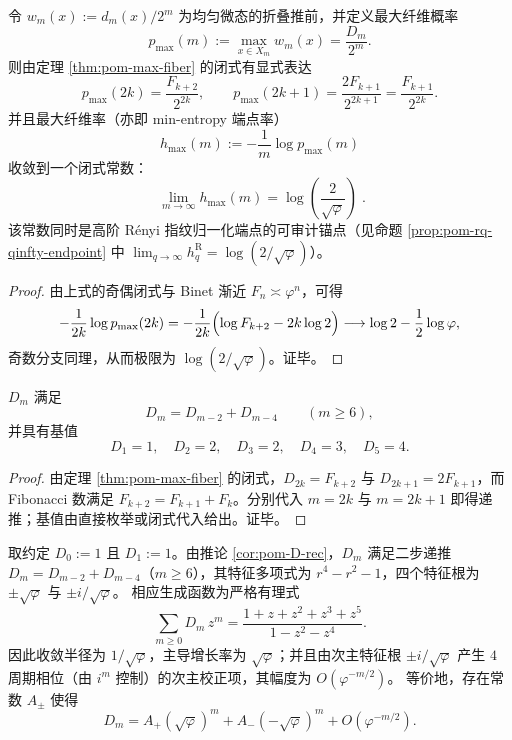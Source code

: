 \begin{corollary}[最大纤维概率端点与可审计极限常数]\label{cor:pom-max-fiber-rate-endpoint}
令 \(w_m(x):=d_m(x)/2^m\) 为均匀微态的折叠推前，并定义最大纤维概率
\[
p_{\max}(m):=\max_{x\in X_m}w_m(x)=\frac{D_m}{2^m}.
\]
则由定理 \ref{thm:pom-max-fiber} 的闭式有显式表达
\[
p_{\max}(2k)=\frac{F_{k+2}}{2^{2k}},
\qquad
p_{\max}(2k+1)=\frac{2F_{k+1}}{2^{2k+1}}=\frac{F_{k+1}}{2^{2k}}.
\]
并且最大纤维率（亦即 min-entropy 端点率）
\[
h_{\max}(m):=-\frac{1}{m}\log p_{\max}(m)
\]
收敛到一个闭式常数：
\[
\boxed{\;
\lim_{m\to\infty}h_{\max}(m)=\log\!\left(\frac{2}{\sqrt{\varphi}}\right)\; }.
\]
该常数同时是高阶 Rényi 指纹归一化端点的可审计锚点（见命题 \ref{prop:pom-rq-qinfty-endpoint} 中 \(\lim_{q\to\infty}h_q^{\mathrm R}=\log(2/\sqrt{\varphi})\)）。
\end{corollary}
\begin{proof}
由上式的奇偶闭式与 Binet 渐近 \(F_n\asymp \varphi^n\)，可得
\[
-\frac{1}{2k}\log p_{\max}(2k)
=-\frac{1}{2k}\Bigl(\log F_{k+2}-2k\log 2\Bigr)
\longrightarrow \log 2-\frac12\log\varphi,
\]
奇数分支同理，从而极限为 \(\log(2/\sqrt{\varphi})\)。证毕。
\end{proof}



\begin{corollary}[二步递推与基值]\label{cor:pom-D-rec}
$D_m$ 满足
\[
D_m=D_{m-2}+D_{m-4}\qquad(m\ge 6),
\]
并具有基值
\[
D_1=1,\quad D_2=2,\quad D_3=2,\quad D_4=3,\quad D_5=4.
\]
\end{corollary}
\begin{proof}
由定理 \ref{thm:pom-max-fiber} 的闭式，$D_{2k}=F_{k+2}$ 与 $D_{2k+1}=2F_{k+1}$，而 Fibonacci 数满足 $F_{k+2}=F_{k+1}+F_k$。分别代入 $m=2k$ 与 $m=2k+1$ 即得递推；基值由直接枚举或闭式代入给出。证毕。
\end{proof}

\begin{remark}[最大纤维序列的生成函数与四周期次主振荡]\label{rem:pom-D-generating-function}
取约定 \(D_0:=1\) 且 \(D_1:=1\)。由推论 \ref{cor:pom-D-rec}，\(D_m\) 满足二步递推 \(D_m=D_{m-2}+D_{m-4}\)（\(m\ge 6\)），其特征多项式为 \(r^{4}-r^{2}-1\)，四个特征根为 \(\pm\sqrt{\varphi}\) 与 \(\pm i/\sqrt{\varphi}\)。
相应生成函数为严格有理式
\[
\sum_{m\ge 0} D_m\,z^m=\frac{1+z+z^{2}+z^{3}+z^{5}}{1-z^{2}-z^{4}}.
\]
因此收敛半径为 \(1/\sqrt{\varphi}\)，主导增长率为 \(\sqrt{\varphi}\)；并且由次主特征根 \(\pm i/\sqrt{\varphi}\) 产生 \(4\) 周期相位（由 \(i^m\) 控制）的次主校正项，其幅度为 \(O(\varphi^{-m/2})\)。
等价地，存在常数 \(A_\pm\) 使得
\[
D_m=A_+(\sqrt{\varphi})^{m}+A_-(-\sqrt{\varphi})^{m}+O(\varphi^{-m/2}).
\]
\end{remark}

